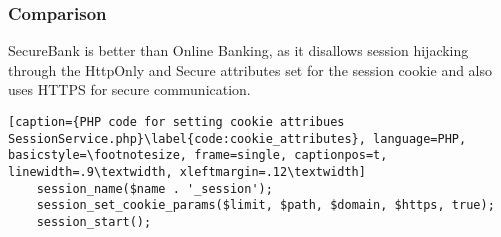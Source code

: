 \subsubsection{Comparison}
SecureBank is better than Online Banking, as it disallows session hijacking through the HttpOnly and Secure attributes set for the session cookie and also uses HTTPS for secure communication.

\begin{lstlisting}[caption={PHP code for setting cookie attribues SessionService.php}\label{code:cookie_attributes}, language=PHP, basicstyle=\footnotesize, frame=single, captionpos=t, linewidth=.9\textwidth, xleftmargin=.12\textwidth]
    session_name($name . '_session');
    session_set_cookie_params($limit, $path, $domain, $https, true);
    session_start();
\end{lstlisting}
\clearpage